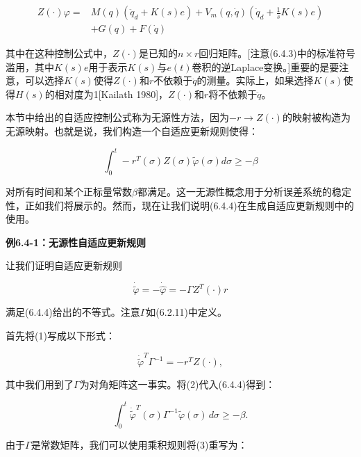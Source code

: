\documentclass[12pt,a4paper]{ctexart}
\begin{document}
\begin{equation}\label{eq:6.4.3}
\begin{aligned}
Z(\cdot)\varphi =& M(q)\left(\ddot{q}_d + K(s)e\right) + V_m(q, \dot{q})\left(\dot{q}_d + \frac{1}{s}K(s)e\right) \\
&+ G(q) + F(\dot{q})
\end{aligned}
\end{equation}

其中在这种控制公式中，$Z(\cdot)$是已知的$n \times r$回归矩阵。[注意(6.4.3)中的标准符号滥用，其中$K(s)e$用于表示$K(s)$与$e(t)$卷积的逆Laplace变换。]重要的是要注意，可以选择$K(s)$使得$Z(\cdot)$和$r$不依赖于$\ddot{q}$的测量。实际上，如果选择$K(s)$使得$H(s)$的相对度为1[Kailath 1980]，$Z(\cdot)$和$r$将不依赖于$\ddot{q}$。

本节中给出的自适应控制公式称为无源性方法，因为$-r \rightarrow Z(\cdot)$的映射被构造为无源映射。也就是说，我们构造一个自适应更新规则使得：

\begin{equation}\label{eq:6.4.4}
\int_0^t -r^T(\sigma)Z(\sigma)\tilde{\varphi}(\sigma)d\sigma \geq -\beta
\end{equation}

对所有时间和某个正标量常数$\beta$都满足。这一无源性概念用于分析误差系统的稳定性，正如我们将展示的。然而，现在让我们说明(6.4.4)在生成自适应更新规则中的使用。

\textbf{例6.4-1：无源性自适应更新规则}

让我们证明自适应更新规则

\begin{equation}
\dot{\tilde{\varphi}} = -\dot{\hat{\varphi}} = -\Gamma Z^T (\cdot) r \tag{1}
\end{equation}

满足(6.4.4)给出的不等式。注意$\Gamma$如(6.2.11)中定义。

首先将(1)写成以下形式：

\begin{equation}\tag{2}
\dot{\tilde{\varphi}}^T \Gamma^{-1} = -r^T Z(\cdot),
\end{equation}

其中我们用到了$\Gamma$为对角矩阵这一事实。将(2)代入(6.4.4)得到：

\begin{equation}\tag{3}
\int_0^t \dot{\tilde{\varphi}}^T(\sigma) \Gamma^{-1} \tilde{\varphi}(\sigma)\,d\sigma \geq -\beta.
\end{equation}

由于$\Gamma$是常数矩阵，我们可以使用乘积规则将(3)重写为：
\end{document}
